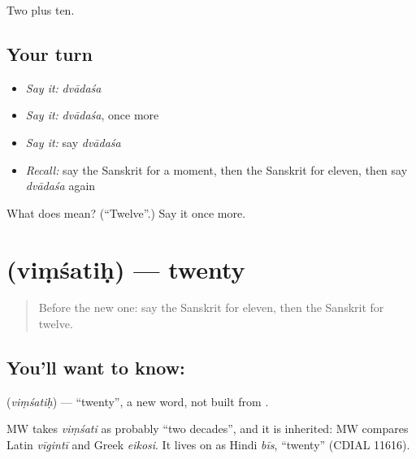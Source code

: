 \begin{grammarlens}[title={What you've built}]
Two plus ten.
\end{grammarlens}

\subsection*{Your turn}
\begin{itemize}
\raggedright
  \item \emph{Say it:} \emph{dvādaśa}
  \item \emph{Say it:} \emph{dvādaśa}, once more
  \item \emph{Say it:} say \emph{dvādaśa}
  \item \emph{Recall:} say the Sanskrit for a moment, then the Sanskrit for eleven, then say \emph{dvādaśa} again
\end{itemize}

\begin{tcolorbox}[breakable,colback=teal!4,colframe=teal!35!black,title={Before you move on}]
What does  mean? (\textquotedblleft{}Twelve\textquotedblright{}.) Say it once more.
\end{tcolorbox}
\section[\texorpdfstring{\sk{विंशतिः} (viṃśatiḥ)}{विंशतिः (viṃśatiḥ)}]{ (viṃśatiḥ) — twenty}

\label{lesson:SA-C87-twenty}



\begin{quote}
Before the new one: say the Sanskrit for eleven, then the Sanskrit for twelve.
\end{quote}

\subsection*{You'll want to know: }
\textbf{} (\emph{viṃśatiḥ}) — \textquotedblleft{}twenty\textquotedblright{}, a new word, not built from \textbf{}.

\begin{cousinweb}
MW takes \emph{viṃśati} as probably \textquotedblleft{}two decades\textquotedblright{}, and it is inherited: MW compares Latin \emph{vīgintī} and Greek \emph{eikosi}. It lives on as Hindi \emph{bīs}, \textquotedblleft{}twenty\textquotedblright{} (CDIAL 11616).
\end{cousinweb}

